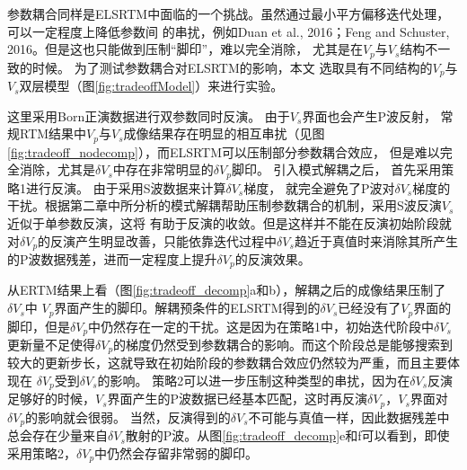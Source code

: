 参数耦合同样是ELSRTM中面临的一个挑战。虽然通过最小平方偏移迭代处理，可以一定程度上降低参数间
的串扰，例如Duan et al., 2016\cite{Duan2016}；Feng and
Schuster, 2016\cite{Feng2016}。但是这也只能做到压制“脚印”，难以完全消除，
尤其是在$V_p$与$V_s$结构不一致的时候。%
为了测试参数耦合对ELSRTM的影响，本文
选取具有不同结构的$V_p$与$V_s$双层模型（图\ref{fig:tradeoffModel}）来进行实验。

这里采用Born正演数据进行双参数同时反演。
由于$V_s$界面也会产生P波反射，
常规RTM结果中$V_p$与$V_s$成像结果存在明显的相互串扰（见图\ref{fig:tradeoff_nodecomp}），而ELSRTM可以压制部分参数耦合效应，
但是难以完全消除，尤其是$\delta V_s$中存在非常明显的$\delta V_p$脚印。
引入模式解耦之后，
首先采用策略1进行反演。
由于采用S波数据来计算$\delta V_s$梯度，
就完全避免了P波对$\delta
V_s$梯度的干扰。根据第二章中所分析的模式解耦帮助压制参数耦合的机制，采用S波反演$V_s$近似于单参数反演，这将
有助于反演的收敛。但是这样并不能在反演初始阶段就对$\delta
V_p$的反演产生明显改善，只能依靠迭代过程中$\delta
V_s$趋近于真值时来消除其所产生的P波数据残差，进而一定程度上提升$\delta V_p$的反演效果。

从ERTM结果上看（图\ref{fig:tradeoff_decomp}a和b），解耦之后的成像结果压制了$\delta V_s$中
$V_p$界面产生的脚印。解耦预条件的ELSRTM得到的$\delta
V_s$已经没有了$V_p$界面的脚印，但是$\delta
V_p$中仍然存在一定的干扰。这是因为在策略1中，初始迭代阶段中$\delta
V_s$更新量不足使得$\delta
V_p$的梯度仍然受到参数耦合的影响。而这个阶段总是能够搜索到较大的更新步长，这就导致在初始阶段的参数耦合效应仍然较为严重，而且主要体现在
$\delta V_p$受到$\delta V_s$的影响。
策略2可以进一步压制这种类型的串扰，因为在$\delta
V_s$反演足够好的时候，$V_s$界面产生的P波数据已经基本匹配，这时再反演$\delta
V_p$，$V_s$界面对$\delta V_p$的影响就会很弱。
当然，反演得到的$\delta V_s$不可能与真值一样，因此数据残差中总会存在少量来自$\delta
V_s$散射的P波。从图\ref{fig:tradeoff_decomp}e和f可以看到，即使采用策略2，$\delta V_p$中仍然会存留非常弱的脚印。


